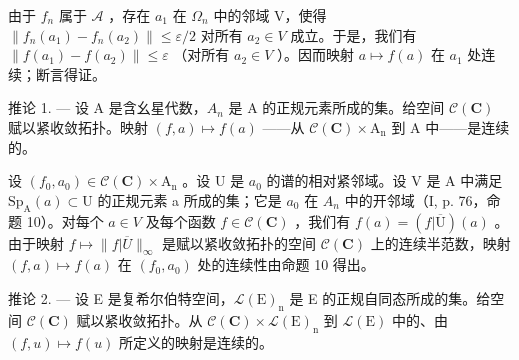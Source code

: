 由于 \(f_n\) 属于 \(\mathcal{A}\) ，存在 \(a_1\) 在 \(\Omega_n\) 中的邻域 V，使得 \(\| f_n(a_1) - f_n(a_2) \| \leqslant \varepsilon / 2\) 对所有 \(a_2 \in V\) 成立。于是，我们有 \(\| f(a_1) - f(a_2) \| \leqslant \varepsilon\) （对所有 \(a_2 \in V\) ）。因而映射 \(a \mapsto f(a)\) 在 \(a_1\) 处连续；断言得证。

推论 1. --- 设 A 是含幺星代数，\(A_{n}\) 是 A 的正规元素所成的集。给空间 \(\mathcal{C}(\mathbf{C})\) 赋以紧收敛拓扑。映射 \((f,a)\mapsto f(a)\) ——从 \(\mathcal{C}(\mathbf{C})\times\mathrm{A}_{\mathrm{n}}\) 到 A 中——是连续的。

设 \((f_{0}, a_{0}) \in \mathcal{C}(\mathbf{C}) \times \mathrm{A}_{\mathrm{n}}\) 。设 U 是 \(a_{0}\) 的谱的相对紧邻域。设 V 是 A 中满足 \(\mathrm{Sp}_{\mathrm{A}}(a) \subset \mathrm{U}\) 的正规元素 a 所成的集；它是 \(a_{0}\) 在 \(A_{n}\) 中的开邻域（I, p. 76，命题 10）。对每个 \(a \in V\) 及每个函数 \(f \in \mathcal{C}(\mathbf{C})\) ，我们有 \(f(a) = (f|\overline{\mathrm{U}})(a)\) 。由于映射 \(f \mapsto \|f|\overline{U}\|_{\infty}\) 是赋以紧收敛拓扑的空间 \(\mathcal{C}(\mathbf{C})\) 上的连续半范数，映射 \((f, a) \mapsto f(a)\) 在 \((f_{0}, a_{0})\) 处的连续性由命题 10 得出。

推论 2. --- 设 E 是复希尔伯特空间，\(\mathcal{L}(\mathrm{E})_{\mathrm{n}}\) 是 E 的正规自同态所成的集。给空间 \(\mathcal{C}(\mathbf{C})\) 赋以紧收敛拓扑。从 \(\mathcal{C}(\mathbf{C}) \times \mathcal{L}(\mathrm{E})_{\mathrm{n}}\) 到 \(\mathcal{L}(\mathrm{E})\) 中的、由 \((f, u) \mapsto f(u)\) 所定义的映射是连续的。

